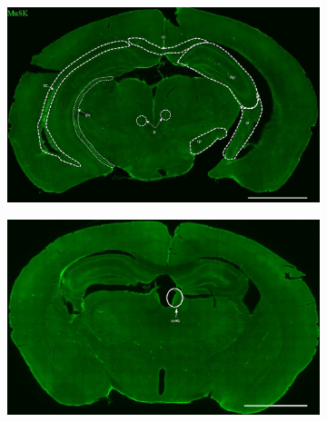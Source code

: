 	\begin{figure}[h] %
		\begin{subfigure}[h]{0.49\textwidth}
			\caption{}
			\label{fig:locaMusK}
			\includegraphics[width=\textwidth]{./Images/Immuno/Musk/loca_MuSK_mut.jpg}
		\end{subfigure}
		\begin{subfigure}[h]{0.49\textwidth}
		\caption{}
		\label{fig:locaMusKwt}
		\includegraphics[width=\textwidth]{./Images/Immuno/Musk/loca_MuSK_wt.jpg}
		\end{subfigure}
		\begin{subfigure}[h]{0.245\textwidth}
			\caption{}
			\label{fig:locaMuSKcc}

\end{subfigure}
\end{figure}
